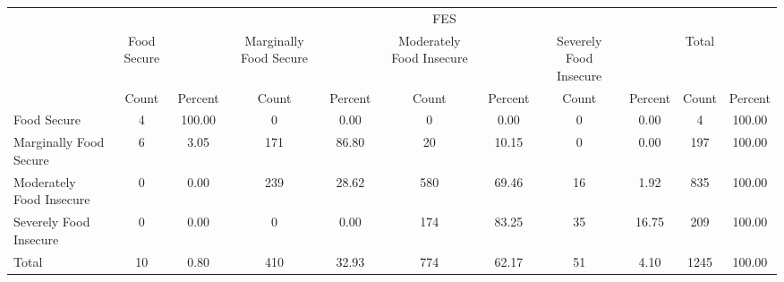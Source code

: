 {
\def\sym#1{\ifmmode^{#1}\else\(^{#1}\)\fi}
\begin{tabular}{l*{5}{cc}}
\hline\hline
            &\multicolumn{10}{c}{FES}                                                                                                         \\
            & Food Secure&            &Marginally Food Secure&            &Moderately Food Insecure&            &Severely Food Insecure&            &       Total&            \\
            &       Count&     Percent&       Count&     Percent&       Count&     Percent&       Count&     Percent&       Count&     Percent\\
\hline
Food Secure &           4&      100.00&           0&        0.00&           0&        0.00&           0&        0.00&           4&      100.00\\
Marginally Food Secure&           6&        3.05&         171&       86.80&          20&       10.15&           0&        0.00&         197&      100.00\\
Moderately Food Insecure&           0&        0.00&         239&       28.62&         580&       69.46&          16&        1.92&         835&      100.00\\
Severely Food Insecure&           0&        0.00&           0&        0.00&         174&       83.25&          35&       16.75&         209&      100.00\\
Total       &          10&        0.80&         410&       32.93&         774&       62.17&          51&        4.10&        1245&      100.00\\
\hline\hline
\end{tabular}
}

